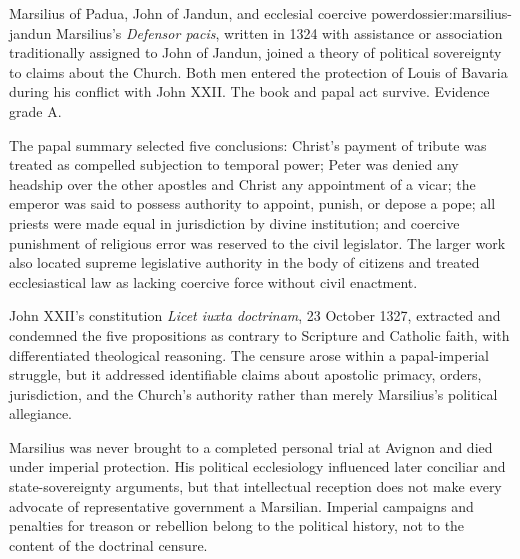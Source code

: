 \begin{heresydossier}{Marsilius of Padua, John of Jandun, and ecclesial coercive power}{dossier:marsilius-jandun}
\objectfield Marsilius's \emph{Defensor pacis}, written in 1324 with assistance or association traditionally assigned to John of Jandun, joined a theory of political sovereignty to claims about the Church. Both men entered the protection of Louis of Bavaria during his conflict with John XXII. The book and papal act survive. Evidence grade A.

\propositionfield The papal summary selected five conclusions: Christ's payment of tribute was treated as compelled subjection to temporal power; Peter was denied any headship over the other apostles and Christ any appointment of a vicar; the emperor was said to possess authority to appoint, punish, or depose a pope; all priests were made equal in jurisdiction by divine institution; and coercive punishment of religious error was reserved to the civil legislator. The larger work also located supreme legislative authority in the body of citizens and treated ecclesiastical law as lacking coercive force without civil enactment.

\responsefield John XXII's constitution \emph{Licet iuxta doctrinam}, 23 October 1327, extracted and condemned the five propositions as contrary to Scripture and Catholic faith, with differentiated theological reasoning. The censure arose within a papal-imperial struggle, but it addressed identifiable claims about apostolic primacy, orders, jurisdiction, and the Church's authority rather than merely Marsilius's political allegiance.

\aftermathfield Marsilius was never brought to a completed personal trial at Avignon and died under imperial protection. His political ecclesiology influenced later conciliar and state-sovereignty arguments, but that intellectual reception does not make every advocate of representative government a Marsilian. Imperial campaigns and penalties for treason or rebellion belong to the political history, not to the content of the doctrinal censure.
\end{heresydossier}

